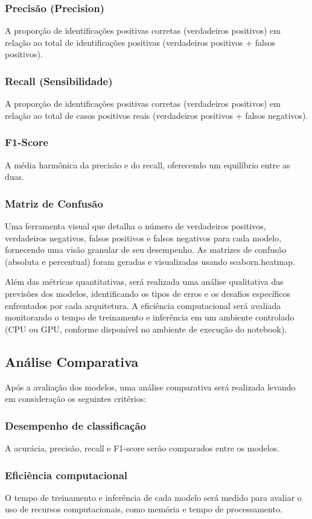 \documentclass[12pt]{article}
\begin{document}
\subsubsection*{Precisão (Precision)}
A proporção de identificações positivas corretas (verdadeiros positivos) em relação ao total de identificações positivas (verdadeiros positivos + falsos positivos). 
\subsubsection*{Recall (Sensibilidade)}
A proporção de identificações positivas corretas (verdadeiros positivos) em relação ao total de casos positivos reais (verdadeiros positivos + falsos negativos). 
\subsubsection*{F1-Score}
A média harmônica da precisão e do recall, oferecendo um equilíbrio entre as duas. 
\subsubsection*{Matriz de Confusão}
    Uma ferramenta visual que detalha o número de verdadeiros positivos, verdadeiros negativos, falsos positivos e falsos negativos para cada modelo, fornecendo uma visão granular de seu desempenho. As matrizes de confusão (absoluta e percentual) foram geradas e visualizadas usando seaborn.heatmap. 

Além das métricas quantitativas, será realizada uma análise qualitativa das previsões dos modelos, identificando os tipos de erros e os desafios específicos enfrentados por cada arquitetura. A eficiência computacional será avaliada monitorando o tempo de treinamento e inferência em um ambiente controlado (CPU ou GPU, conforme disponível no ambiente de execução do notebook). 

\subsection{Análise Comparativa}
Após a avaliação dos modelos, uma análise comparativa será realizada levando em consideração os seguintes critérios:
\subsubsection*{Desempenho de classificação}
A acurácia, precisão, recall e F1-score serão comparados entre os modelos. 
\subsubsection*{Eficiência computacional}
O tempo de treinamento e inferência de cada modelo será medido para avaliar o uso de recursos computacionais, como memória e tempo de processamento.  
\end{document}
